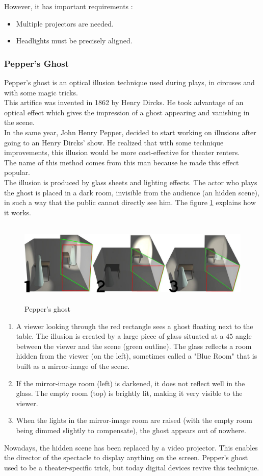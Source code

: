 However, it has important requirements : 
\begin{itemize}
\item Multiple projectors are needed.
\item Headlights must be precisely aligned.
\end{itemize}

\subsubsection{Pepper's Ghost}
Pepper's ghost is an optical illusion technique used during plays, in circuses and with some magic tricks.\\
This artifice was invented in 1862 by Henry Dircks. He took advantage of an optical effect which gives the impression of a ghost appearing and vanishing in the scene.\\
In the same year, John Henry Pepper, decided to start working on illusions after going to an Henry Dircks' show. He realized that with some technique improvements, this illusion would be more cost-effective for theater renters.\\
The name of this method comes from this man because he made this effect popular.\\

The illusion is produced by glass sheets and lighting effects. The actor who plays the ghost is placed in a dark room, invisible from the audience (an hidden scene), in such a way that the public cannot directly see him\cite{Peppers-ghost}. 
The figure \ref{fig:pepperghost} explains how it works.

\begin{figure}[h!]
\centering
\includegraphics[width=14cm,height=4cm]{image/peppersG.jpg}
\caption{Pepper's ghost}
\label{fig:pepperghost}
\end{figure}

\begin{enumerate}
\item A viewer looking through the red rectangle sees a ghost floating next to the table. The illusion is created by a large piece of glass situated at a $45$\textdegree{} angle between the viewer and the scene (green outline). The glass reflects a room hidden from the viewer (on the left), sometimes called a "Blue Room" that is built as a mirror-image of the scene.
\item If the mirror-image room (left) is darkened, it does not reflect well in the glass. The empty room (top) is brightly lit, making it very visible to the viewer.
\item  When the lights in the mirror-image room are raised (with the empty room being dimmed slightly to compensate), the ghost appears out of nowhere.
\end{enumerate}

Nowadays, the hidden scene has been replaced by a video projector. This enables the director of the spectacle to display anything on the screen. Pepper's ghost used to be a theater-specific trick, but today digital devices revive this technique.